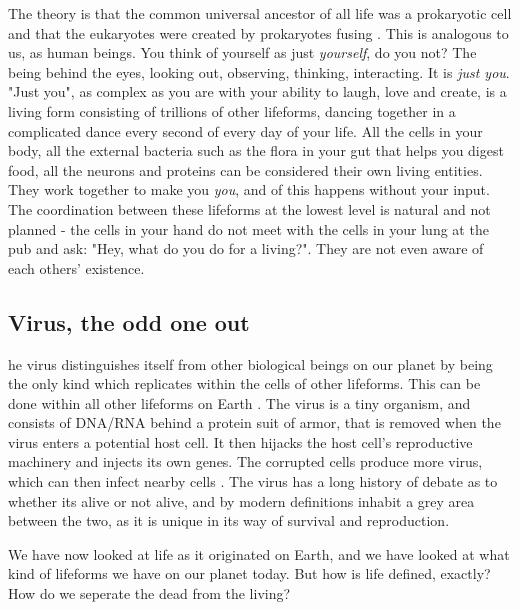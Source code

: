 The theory is that the common universal ancestor of all life was a prokaryotic cell and that the eukaryotes were created by prokaryotes fusing \cite{ProcaEuka}.
This is analogous to us, as human beings.
You think of yourself as just \textit {yourself}, do you not?
The being behind the eyes, looking out, observing, thinking, interacting.
It is \textit{just you}.
"Just you", as complex as you are with your ability to laugh, love and create, is a living form consisting of trillions of other lifeforms, dancing together in a complicated dance every second of every day of your life.
All the cells in your body, all the external bacteria such as the flora in your gut that helps you digest food, all the neurons and proteins can be considered their own living entities.
They work together to make you \textit{you}, and of this happens without your input.
The coordination between these lifeforms at the lowest level is natural and not planned - the cells in your hand do not meet with the cells in your lung at the pub and ask: "Hey, what do you do for a living?".
They are not even aware of each others' existence.

\subsection{Virus, the odd one out}

he virus distinguishes itself from other biological beings on our planet by being the only kind which replicates within the cells of other lifeforms.
This can be done within all other lifeforms on Earth \cite{koonin}.
The virus is a tiny organism, and consists of DNA/RNA behind a protein suit of armor, that is removed when the virus enters a potential host cell.
It then hijacks the host cell's reproductive machinery and injects its own genes.
The corrupted cells produce more virus, which can then infect nearby cells \cite{villareal}.
The virus has a long history of debate as to whether its alive or not alive, and by modern definitions inhabit a grey area between the two, as it is unique in its way of survival and reproduction.


We have now looked at life as it originated on Earth, and we have looked at what kind of lifeforms we have on our planet today. But how is life defined, exactly? How do we seperate the dead from the living? 
